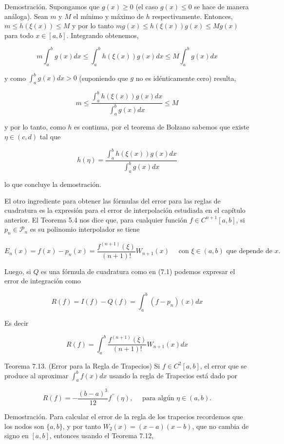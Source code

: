 \documentclass[10pt]{article}
\begin{document}
Demostración. Supongamos que $g(x) \geq 0$ (el caso $g(x) \leq 0$ se hace de manera análoga). Sean $m$ y $M$ el mínimo y máximo de $h$ respectivamente. Entonces, $m \leq h(\xi(x)) \leq M$ y por lo tanto $m g(x) \leq h(\xi(x)) g(x) \leq M g(x)$ para todo $x \in[a, b]$. Integrando obtenemos,

$$
m \int_{a}^{b} g(x) d x \leq \int_{a}^{b} h(\xi(x)) g(x) d x \leq M \int_{a}^{b} g(x) d x
$$

y como $\int_{a}^{b} g(x) d x>0$ (suponiendo que $g$ no es idénticamente cero) resulta,

$$
m \leq \frac{\int_{a}^{b} h(\xi(x)) g(x) d x}{\int_{a}^{b} g(x) d x} \leq M
$$

y por lo tanto, como $h$ es continua, por el teorema de Bolzano sabemos que existe $\eta \in(c, d)$ tal que

$$
h(\eta)=\frac{\int_{a}^{b} h(\xi(x)) g(x) d x}{\int_{a}^{b} g(x) d x}
$$

lo que concluye la demostración.

El otro ingrediente para obtener las fórmulas del error para las reglas de cuadratura es la expresión para el error de interpolación estudiada en el capítulo anterior. El Teorema 5.4 nos dice que, para cualquier función $f \in C^{n+1}[a, b]$, si $p_{n} \in \mathcal{P}_{n}$ es su polinomio interpolador se tiene

$$
E_{n}(x)=f(x)-p_{n}(x)=\frac{f^{(n+1)}(\xi)}{(n+1)!} W_{n+1}(x) \quad \text { con } \xi \in(a, b) \text { que depende de } x .
$$

Luego, si $Q$ es una fórmula de cuadratura como en (7.1) podemos expresar el error de integración como

$$
R(f)=I(f)-Q(f)=\int_{a}^{b}\left(f-p_{n}\right)(x) d x
$$

Es decir

$$
R(f)=\int_{a}^{b} \frac{f^{(n+1)}(\xi)}{(n+1)!} W_{n+1}(x) d x
$$

Teorema 7.13. (Error para la Regla de Trapecios) Si $f \in C^{2}[a, b]$, el error que se produce al aproximar $\int_{a}^{b} f(x) d x$ usando la regla de Trapecios está dado por


\begin{equation*}
R(f)=-\frac{(b-a)^{3}}{12} f^{\prime \prime}(\eta), \quad \text { para algún } \eta \in(a, b) . \tag{7.7}
\end{equation*}


Demostración. Para calcular el error de la regla de los trapecios recordemos que los nodos son $\{a, b\}$, y por tanto $W_{2}(x)=(x-a)(x-b)$, que no cambia de signo en $[a, b]$, entonces usando el Teorema 7.12,
\end{document}

